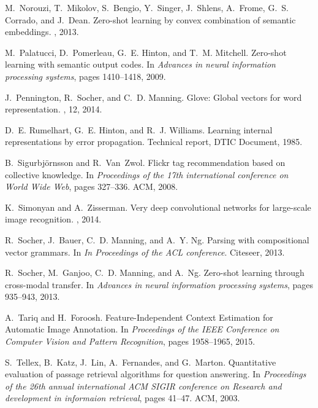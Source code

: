 \documentclass[10pt,twocolumn,letterpaper]{article}
\begin{document}
\begin{thebibliography}{10}
M.~Norouzi, T.~Mikolov, S.~Bengio, Y.~Singer, J.~Shlens, A.~Frome, G.~S.
  Corrado, and J.~Dean.
\newblock Zero-shot learning by convex combination of semantic embeddings.
, 2013.

M.~Palatucci, D.~Pomerleau, G.~E. Hinton, and T.~M. Mitchell.
\newblock Zero-shot learning with semantic output codes.
\newblock In {\em Advances in neural information processing systems}, pages
  1410--1418, 2009.

J.~Pennington, R.~Socher, and C.~D. Manning.
\newblock Glove: {Global} vectors for word representation.
, 12, 2014.

D.~E. Rumelhart, G.~E. Hinton, and R.~J. Williams.
\newblock Learning internal representations by error propagation.
\newblock Technical report, DTIC Document, 1985.

B.~Sigurbjörnsson and R.~Van~Zwol.
\newblock Flickr tag recommendation based on collective knowledge.
\newblock In {\em Proceedings of the 17th international conference on {World}
  {Wide} {Web}}, pages 327--336. ACM, 2008.

K.~Simonyan and A.~Zisserman.
\newblock Very deep convolutional networks for large-scale image recognition.
, 2014.

R.~Socher, J.~Bauer, C.~D. Manning, and A.~Y. Ng.
\newblock Parsing with compositional vector grammars.
\newblock In {\em In {Proceedings} of the {ACL} conference}. Citeseer, 2013.

R.~Socher, M.~Ganjoo, C.~D. Manning, and A.~Ng.
\newblock Zero-shot learning through cross-modal transfer.
\newblock In {\em Advances in neural information processing systems}, pages
  935--943, 2013.

A.~Tariq and H.~Foroosh.
\newblock Feature-{Independent} {Context} {Estimation} for {Automatic} {Image}
  {Annotation}.
\newblock In {\em Proceedings of the {IEEE} {Conference} on {Computer} {Vision}
  and {Pattern} {Recognition}}, pages 1958--1965, 2015.

S.~Tellex, B.~Katz, J.~Lin, A.~Fernandes, and G.~Marton.
\newblock Quantitative evaluation of passage retrieval algorithms for question
  answering.
\newblock In {\em Proceedings of the 26th annual international {ACM} {SIGIR}
  conference on {Research} and development in informaion retrieval}, pages
  41--47. ACM, 2003.


\end{thebibliography}
\end{document}
